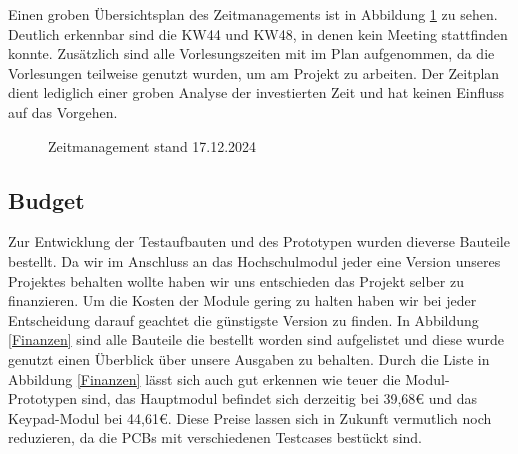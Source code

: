 
Einen groben Übersichtsplan des Zeitmanagements ist in Abbildung \ref{zeitplan} zu sehen. Deutlich erkennbar sind die KW44 und KW48, in denen kein Meeting stattfinden konnte. Zusätzlich sind alle Vorlesungszeiten mit im Plan aufgenommen, da die Vorlesungen teilweise genutzt wurden, um am Projekt zu arbeiten. Der Zeitplan dient lediglich einer groben Analyse der investierten Zeit und hat keinen Einfluss auf das Vorgehen.

\begin{figure}[H]
    \centering    
    \caption{Zeitmanagement stand 17.12.2024}
    \label{zeitplan}
\end{figure}


\subsection{Budget}
Zur Entwicklung der Testaufbauten und des Prototypen wurden dieverse Bauteile bestellt. Da wir im Anschluss an das Hochschulmodul jeder eine Version unseres Projektes behalten wollte haben wir uns entschieden das Projekt selber zu finanzieren.
Um die Kosten der Module gering zu halten haben wir bei jeder Entscheidung darauf geachtet die günstigste Version zu finden. In Abbildung \ref{Finanzen} sind alle Bauteile die bestellt worden sind aufgelistet und diese wurde genutzt einen Überblick über unsere Ausgaben zu behalten. Durch die Liste in Abbildung \ref{Finanzen} lässt sich auch gut erkennen wie teuer die Modul-Prototypen sind, das Hauptmodul befindet sich derzeitig bei 39,68€ und das Keypad-Modul bei 44,61€. Diese Preise lassen sich in Zukunft vermutlich noch reduzieren, da die PCBs mit verschiedenen Testcases bestückt sind. 

